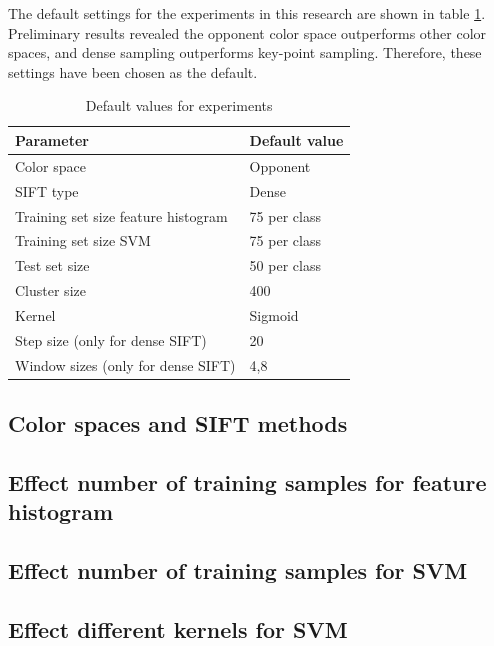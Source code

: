 The default settings for the experiments in this research are shown in table \ref{tab:default}. Preliminary results revealed the opponent color space outperforms other color spaces, and dense sampling outperforms key-point sampling. Therefore, these settings have been chosen as the default.
\begin{table}[H]
\begin{tabular}{|l|l|}
\hline
\textbf{Parameter} & \textbf{Default value}\\
\hline
Color space & Opponent\\
SIFT type & Dense\\
Training set size feature histogram & 75 per class\\
Training set size SVM & 75 per class\\
Test set size & 50 per class \\
Cluster size & 400 \\
Kernel & Sigmoid \\
Step size (only for dense SIFT) & 20\\
Window sizes (only for dense SIFT) & 4,8\\
\hline
\end{tabular}
\caption{Default values for experiments}
\label{tab:default}
\end{table}


\subsection{Color spaces and SIFT methods}


\subsection{Effect number of training samples for feature histogram}


\subsection{Effect number of training samples for SVM}











\subsection{Effect different kernels for SVM}

